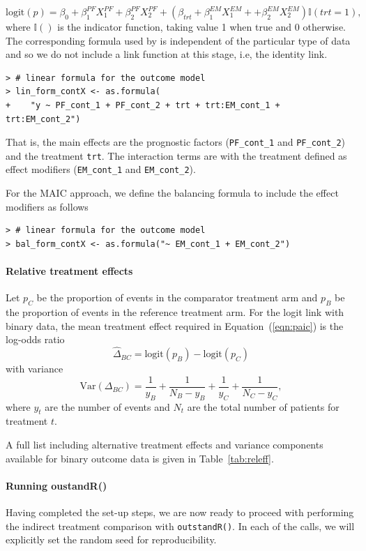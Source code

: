 \documentclass[article]{jss}
\begin{document}
$$
\text{logit}(p) = \beta_0 + \beta^{PF}_{1} X^{PF}_{1} + \beta^{PF}_{2 }X^{PF}_{2} + (\beta_{trt} + \beta^{EM}_{1} X^{EM}_{1} + + \beta^{EM}_{2} X^{EM}_{2}) \mathbb{I}(trt = 1),
$$
where $\mathbb{I}()$ is the indicator function, taking value 1 when true and 0 otherwise.
The corresponding  formula used by  is independent of the particular type of data and so we do not include a link function at this stage, i.e, the identity link.
\begin{verbatim}
> # linear formula for the outcome model
> lin_form_contX <- as.formula(
+    "y ~ PF_cont_1 + PF_cont_2 + trt + trt:EM_cont_1 + trt:EM_cont_2")
\end{verbatim}
That is, the main effects are the prognostic factors (\texttt{PF\_cont\_1} and \texttt{PF\_cont\_2}) and the treatment  \texttt{trt}. The interaction terms are with the treatment defined as effect modifiers (\texttt{EM\_cont\_1} and \texttt{EM\_cont\_2}). 

For the MAIC approach, we define the balancing formula to include the effect modifiers as follows 
\begin{verbatim}
> # linear formula for the outcome model
> bal_form_contX <- as.formula("~ EM_cont_1 + EM_cont_2")
\end{verbatim}

\paragraph{Relative treatment effects}
Let $p_C$ be the proportion of events in the comparator treatment arm and $p_B$ be the proportion of events in the reference treatment arm. For the logit link with binary data, the mean treatment effect required in Equation~(\ref{eqn:paic}) is the log-odds ratio
$$
\hat{\Delta}_{BC} = \text{logit}(p_B) - \text{logit}(p_C)
$$
with variance
$$
\text{Var}(\Delta_{BC}) = \frac{1}{y_B} + \frac{1}{N_B - y_B} + \frac{1}{y_C} + \frac{1}{N_C - y_C},
$$
where $y_t$ are the number of events and $N_t$ are the total number of patients for treatment $t$.

A full list including alternative treatment effects and variance components available for binary outcome data is given in Table~\ref{tab:releff}.


\paragraph{Running oustandR()}
Having completed the set-up steps, we are now ready to proceed with performing the indirect treatment comparison with \texttt{outstandR()}. In each of the calls, we will explicitly set the random seed for reproducibility.
\end{document}
